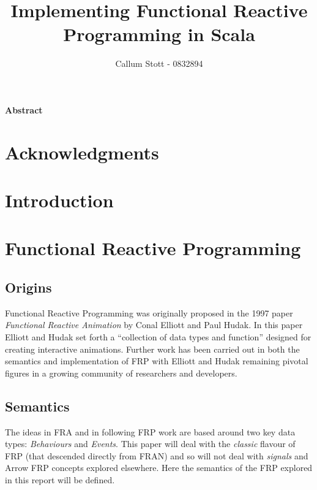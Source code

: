 \documentclass[12pt]{article}
\title{Implementing Functional Reactive Programming in Scala}
\author{Callum Stott - 0832894}
\begin{document}
  \maketitle
  \paragraph*{Abstract}
  
  \newpage
  \section*{Acknowledgments}
    
  
  \newpage
  \tableofcontents
  
  \newpage
  
  \section{Introduction}
  
  \section{Functional Reactive Programming}
    \subsection{Origins}
      Functional Reactive Programming was originally proposed in the 1997 paper \emph{Functional
      Reactive Animation} by Conal Elliott and Paul Hudak. In this paper Elliott and Hudak
      set forth a ``collection of data types and function'' designed for creating interactive 
      animations. Further work has been carried out in both the semantics and implementation
      of FRP with Elliott and Hudak remaining pivotal figures in a growing community of researchers
      and developers.
      
    \subsection{Semantics}
      The ideas in FRA and in following FRP work are based around two key data types: 
      \emph{Behaviours} and \emph{Events}. This paper will deal with the \emph{classic} flavour of
      FRP (that descended directly from FRAN) and so will not deal with \emph{signals} and Arrow FRP
      concepts explored elsewhere. Here the semantics of the FRP explored in this report will be defined.
      
\end{document}

